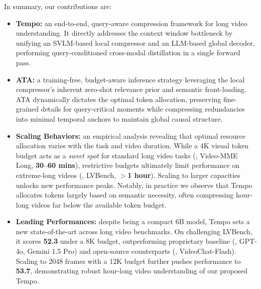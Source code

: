 In summary, our contributions are:
\vspace{-0.5em}
\begin{itemize}
    \item \textbf{Tempo:} an end-to-end, query-aware compression framework for long video understanding. It directly addresses the context window bottleneck by unifying an SVLM-based local compressor and an LLM-based global decoder, performing query-conditioned cross-modal distillation in a single forward pass.
    \item \textbf{ATA:} a training-free, budget-aware inference strategy leveraging the local compressor's inherent zero-shot relevance prior and semantic front-loading. ATA dynamically dictates the optimal token allocation, preserving fine-grained details for query-critical moments while compressing redundancies into minimal temporal anchors to maintain global causal structure.   
    \item \textbf{Scaling Behaviors:} an empirical analysis revealing that optimal resource allocation varies with the task and video duration. While a 4K visual token budget acts as a \emph{sweet spot} for standard long video tasks (\eg, Video-MME Long, \textbf{30--60 mins}), restrictive budgets ultimately limit performance on extreme-long videos (\eg, LVBench, \textbf{$>$1 hour}). Scaling to larger capacities unlocks new performance peaks. Notably, in practice we observe that Tempo allocates tokens largely based on semantic necessity, often compressing hour-long videos far below the available token budget.
    \item \textbf{Leading Performances:} despite being a compact 6B model, Tempo sets a new state-of-the-art across long video benchmarks. On challenging LVBench, it scores \textbf{52.3} under a 8K budget, outperforming proprietary baseline (\eg, GPT-4o, Gemini 1.5 Pro) and open-source counterparts (\eg, VideoChat-Flash). Scaling to 2048 frames with a 12K budget further pushes performance to \textbf{53.7}, demonstrating robust hour-long video understanding of our proposed Tempo.
\end{itemize}